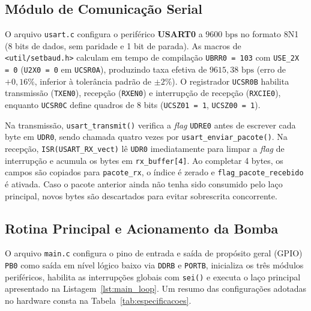 \documentclass[conference]{IEEEtran}
\begin{document}
\subsection{Módulo de Comunicação Serial}
O arquivo \texttt{usart.c} configura o periférico \textbf{USART0} a $9600\text{ bps}$ no formato 8N1 (8 bits de dados, sem paridade e 1 bit de parada). As macros de \texttt{<util/setbaud.h>} calculam em tempo de compilação \texttt{UBRR0 = 103} com \texttt{USE\_2X = 0} (\texttt{U2X0 = 0} em \texttt{UCSR0A}), produzindo taxa efetiva de $9615{,}38\text{ bps}$ (erro de $+0{,}16\%$, inferior à tolerância padrão de $\pm 2\%$). O registrador \texttt{UCSR0B} habilita transmissão (\texttt{TXEN0}), recepção (\texttt{RXEN0}) e interrupção de recepção (\texttt{RXCIE0}), enquanto \texttt{UCSR0C} define quadros de 8 bits (\texttt{UCSZ01 = 1}, \texttt{UCSZ00 = 1}).

Na transmissão, \texttt{usart\_transmit()} verifica a \textit{flag} \texttt{UDRE0} antes de escrever cada byte em \texttt{UDR0}, sendo chamada quatro vezes por \texttt{usart\_enviar\_pacote()}. Na recepção, \texttt{ISR(USART\_RX\_vect)} lê \texttt{UDR0} imediatamente para limpar a \textit{flag} de interrupção e acumula os bytes em \texttt{rx\_buffer[4]}. Ao completar 4 bytes, os campos são copiados para \texttt{pacote\_rx}, o índice é zerado e \texttt{flag\_pacote\_recebido} é ativada. Caso o pacote anterior ainda não tenha sido consumido pelo laço principal, novos bytes são descartados para evitar sobrescrita concorrente.

\subsection{Rotina Principal e Acionamento da Bomba}
O arquivo \texttt{main.c} configura o pino de entrada e saída de propósito geral (GPIO) \texttt{PB0} como saída em nível lógico baixo via \texttt{DDRB} e \texttt{PORTB}, inicializa os três módulos periféricos, habilita as interrupções globais com \texttt{sei()} e executa o laço principal apresentado na Listagem~\ref{lst:main_loop}. Um resumo das configurações adotadas no hardware consta na Tabela~\ref{tab:especificacoes}.
\end{document}
